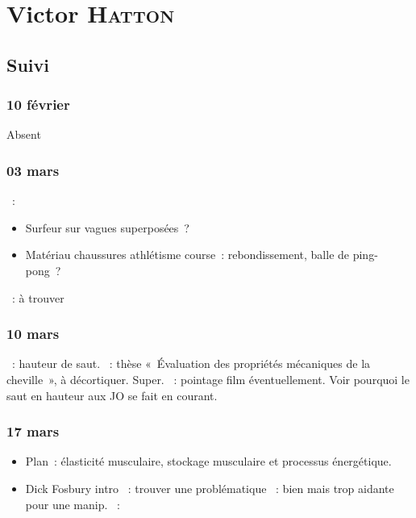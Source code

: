 \documentclass[a4paper, 11pt, final, garamond]{book}
\begin{document}
\chapter{Victor \textsc{Hatton}}
\label{ch:victor}
\section{Suivi}
\subsection{10 février}
\begin{center}
    Absent
\end{center}

\subsection{03 mars}
\begin{itemize}
    ~:
        \begin{itemize}
            \item Surfeur sur vagues superposées~?
            \item Matériau chaussures athlétisme course~: rebondissement, balle
                de ping-pong~?
        \end{itemize}
    ~: à trouver
\end{itemize}

\subsection{10 mars}
\begin{itemize}
    ~: hauteur de saut.
    ~: thèse «~Évaluation des propriétés mécaniques de la
        cheville~», à décortiquer. Super.
    ~: pointage film éventuellement. Voir pourquoi le saut en
        hauteur aux JO se fait en courant.
\end{itemize}

\subsection{17 mars}
\begin{itemize}
    \item Plan~: élasticité musculaire, stockage musculaire et processus
        énergétique.
    \item Dick Fosbury intro
    ~: trouver une problématique
    ~: bien mais trop aidante pour une manip.
    ~: 
\end{itemize}
\end{document}
